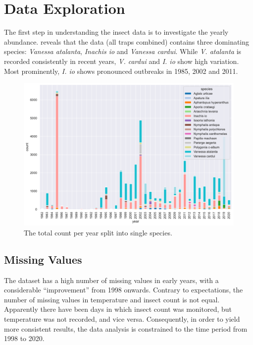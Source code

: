 \section{Data Exploration}

The first step in understanding the insect data is to investigate the yearly abundance.  reveals that the data (all traps combined) contains three dominating species: \textit{Vanessa atalanta}, \textit{Inachis io} and \textit{Vanessa cardui}. While \textit{V. atalanta} is recorded consistently in recent years, \textit{V. cardui} and \textit{I. io} show high variation. Most prominently, \textit{I. io} shows pronounced outbreaks in 1985, 2002 and 2011.

\begin{figure}[H]
	\centering
	\includegraphics[width=0.9\linewidth]{figs/total-count_per_year_per_species}
	\caption{The total count per year split into single species.}
	\label{fig:total-count}
\end{figure}

\subsection{Missing Values}\label{sec:nans}

The dataset has a high number of missing values in early years, with a considerable \enquote{improvement} from 1998 onwards. Contrary to expectations, the number of missing values in temperature and insect count is not equal. Apparently there have been days in which insect count was monitored, but temperature was not recorded, and vice versa.
Consequently, in order to yield more consistent results, the data analysis is constrained to the time period from 1998 to 2020.

